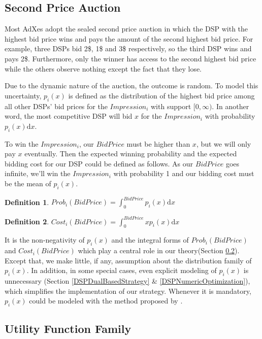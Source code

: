 \documentclass{article}
\newtheorem{definition}{Definition}[section]
\begin{document}
\subsection{Second Price Auction} \label{SecondPriceAuction}

Most AdXes adopt the sealed second price auction in which
    the DSP with the highest bid price wins and pays the amount of the second highest bid price.
For example, three DSPs bid 2\$, 1\$ and 3\$ respectively, so the third DSP wins and pays 2\$.
Furthermore, only the winner has access to the second highest bid price
    while the others observe nothing except the fact that they lose.

Due to the dynamic nature of the auction, the outcome is random.
To model this uncertainty, $p_i(x)$ is defined as the distribution of
    the highest bid price among all other DSPs' bid prices for the $Impression_i$ with support $[0, \infty)$.
In another word, the most competitive DSP will bid $x$ for the $Impression_i$ with probability $p_i(x) \mathrm{d} x$.

To win the $Impression_i$, our $BidPrice$ must be higher than $x$, but we will only pay $x$ eventually.
Then the expected winning probability and the expected bidding cost for our DSP could be defined as follows.
As our $BidPrice$ goes infinite, we'll win the $Impression_i$ with probability 1 and our bidding cost must be the mean of $p_i(x)$.

\begin{definition}
$Prob_i(BidPrice)= \int_0^{BidPrice} p_i(x) \mathrm{d} x$
\end{definition}

\begin{definition}
$Cost_i(BidPrice)= \int_0^{BidPrice} x p_i(x) \mathrm{d} x$
\end{definition}

It is the non-negativity of $p_i(x)$ and the integral forms of $Prob_i(BidPrice)$ and $Cost_i(BidPrice)$
    which play a central role in our theory(Section \ref{UtilityFunctionFamily}).
Except that, we make little, if any, assumption about the distribution family of $p_i(x)$.
In addition, in some special cases, even explicit modeling of $p_i(x)$ is unnecessary
    (Section \ref{DSPDualBasedStrategy} \& \ref{DSPNumericOptimization}), which simplifies the implementation of our strategy.
Whenever it is mandatory, $p_i(x)$ could be modeled with the method proposed by \cite{Wu2015}.

\subsection{Utility Function Family} \label{UtilityFunctionFamily}
\end{document}
